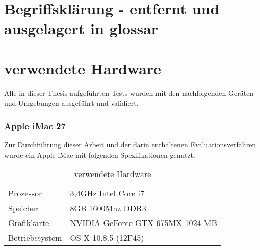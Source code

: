 	
	
	\section{Begriffsklärung - entfernt und ausgelagert in glossar}	
	
	\pagebreak
	\section{verwendete Hardware}
	Alle in dieser Thesis aufgeführten Tests wurden mit den nachfolgenden Geräten und Umgebungen ausgeführt und validiert.
	
	\subsubsection{Apple iMac 27\texttt\dq}
	Zur Durchführung dieser Arbeit und der darin enthaltenen Evaluationsverfahren wurde ein Apple iMac mit folgenden 				Spezifikationen genutzt.
	
	\begin{table}[H]
	 \vspace{-20pt}
 		\centering
			\begin{tabular}{| p{4cm} | p{8cm}  |}
			\hline
				Prozessor			&	3,4GHz Intel Core i7 \\
				Speicher			&	8GB 1600Mhz DDR3\\
				Grafikkarte		&	NVIDIA GeForce GTX 675MX 1024 MB\\
				Betriebssystem		&	OS X 10.8.5 (12F45)\\

				\hline
				\end{tabular}
			\caption{verwendete Hardware}
	\end{table}

